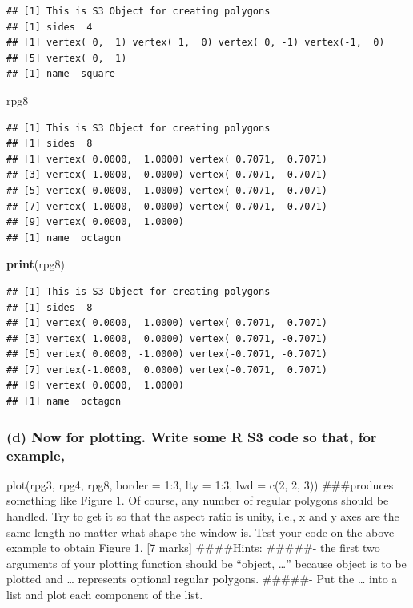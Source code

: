 \documentclass[]{article}
\newenvironment{Shaded}{\begin{snugshade}}{\end{snugshade}}
\newcommand{\KeywordTok}[1]{\textcolor[rgb]{0.13,0.29,0.53}{\textbf{#1}}}
\newcommand{\NormalTok}[1]{#1}
\begin{document}
\begin{verbatim}
## [1] This is S3 Object for creating polygons
## [1] sides  4
## [1] vertex( 0,  1) vertex( 1,  0) vertex( 0, -1) vertex(-1,  0)
## [5] vertex( 0,  1)
## [1] name  square
\end{verbatim}

\begin{Shaded}
\begin{Highlighting}[]
\NormalTok{rpg8}
\end{Highlighting}
\end{Shaded}

\begin{verbatim}
## [1] This is S3 Object for creating polygons
## [1] sides  8
## [1] vertex( 0.0000,  1.0000) vertex( 0.7071,  0.7071)
## [3] vertex( 1.0000,  0.0000) vertex( 0.7071, -0.7071)
## [5] vertex( 0.0000, -1.0000) vertex(-0.7071, -0.7071)
## [7] vertex(-1.0000,  0.0000) vertex(-0.7071,  0.7071)
## [9] vertex( 0.0000,  1.0000)
## [1] name  octagon
\end{verbatim}

\begin{Shaded}
\begin{Highlighting}[]
\KeywordTok{print}\NormalTok{(rpg8)}
\end{Highlighting}
\end{Shaded}

\begin{verbatim}
## [1] This is S3 Object for creating polygons
## [1] sides  8
## [1] vertex( 0.0000,  1.0000) vertex( 0.7071,  0.7071)
## [3] vertex( 1.0000,  0.0000) vertex( 0.7071, -0.7071)
## [5] vertex( 0.0000, -1.0000) vertex(-0.7071, -0.7071)
## [7] vertex(-1.0000,  0.0000) vertex(-0.7071,  0.7071)
## [9] vertex( 0.0000,  1.0000)
## [1] name  octagon
\end{verbatim}

\subsubsection{(d) Now for plotting. Write some R S3 code so that, for
example,}\label{d-now-for-plotting.-write-some-r-s3-code-so-that-for-example}

plot(rpg3, rpg4, rpg8, border = 1:3, lty = 1:3, lwd = c(2, 2, 3))
\#\#\#produces something like Figure 1. Of course, any number of regular
polygons should be handled. Try to get it so that the aspect ratio is
unity, i.e., x and y axes are the same length no matter what shape the
window is. Test your code on the above example to obtain Figure 1. {[}7
marks{]} \#\#\#\#Hints: \#\#\#\#\#- the first two arguments of your
plotting function should be ``object, \ldots{}'' because object is to be
plotted and \ldots{} represents optional regular polygons. \#\#\#\#\#-
Put the \ldots{} into a list and plot each component of the list.
\end{document}
